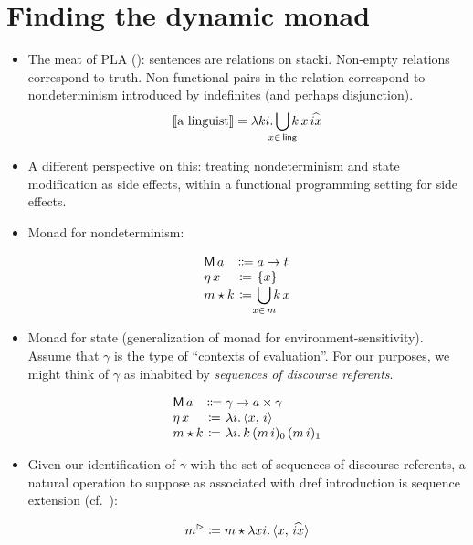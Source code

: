 \section{Finding the dynamic monad}
\begin{itemize}
	\item The meat of PLA (\citealt{Dekker:1994}): sentences are relations on stacki. Non-empty relations correspond to truth. Non-functional pairs in the relation correspond to nondeterminism introduced by indefinites (and perhaps disjunction).%
	\[\sv{\text{a linguist}} = \lambda ki.\bigcup_{\mathclap{x\in\,\textsf{ling}}}k\,x\,\widehat{ix}\]%

	\item A different perspective on this: treating nondeterminism and state modification as side effects, within a functional programming setting for side effects. %
	
	\item Monad for nondeterminism:
	\begin{defi}\label{set}
		\[\begin{array}[t]
			{@{}l@{}c@{}l@{}}
			\textsf{M}\,a &{}\Coloneqq{} &a \ra t%
			\\
			\eta\,x &{}\ceq{} &\{x\}
			\\
			m \star k &{}\ceq{} &\displaystyle\bigcup_{\mathclap{x\in \,m}}k\,x%
		\end{array}\]
	\end{defi}
	
	\item Monad for state (generalization of monad for environment-sensitivity). Assume that $\gamma$ is the type of ``contexts of evaluation''. For our purposes, we might think of $\gamma$ as inhabited by \emph{sequences of discourse referents}.%
	\begin{defi}\label{state}
		\[\begin{array}[t]
			{@{}l@{}c@{}l@{}}
			\textsf{M}\,a &{}\Coloneqq{} &\gamma \ra a \times \gamma	%
			\\
			\eta\,x &{}\ceq{} &\lambda i.\,\ab{x,\,i}
			\\
			m \star k &{}\ceq{} &\lambda i.\,k\,(m\,i)_0\,(m\,i)_1%
		\end{array}\]
	\end{defi}
	
	\item Given our identification of $\gamma$ with the set of sequences of discourse referents, a natural operation to suppose as associated with dref introduction is sequence extension (cf.~\citealt{Groote:2006, Unger:2012}): %
	\begin{defi}
		\[m^\rhd \coloneqq m \star \lambda xi.\,\langle x,\,\widehat{ix} \rangle\]
	\end{defi}
	

\end{itemize}
